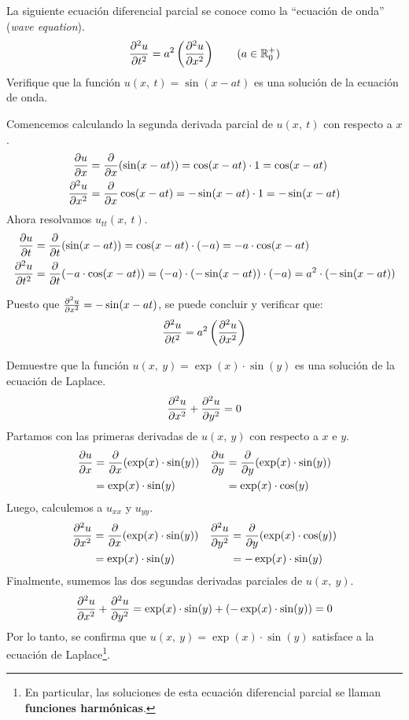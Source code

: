 \documentclass[12pt]{article}
\begin{document}
\ejemplo La siguiente ecuación diferencial parcial se conoce como la ``ecuación de onda'' (\textit{wave equation}).
\[
  \nderivpar[u]{2}{t} = a^{2} \left(\nderivpar[u]{2}{x}\right) \qquad (a \in \R_{0}^{+})
\]
Verifique que la función $u(x, \ t) = \sin(x - at)$ es una solución de la ecuación de onda.

\solucion Comencemos calculando la segunda derivada parcial de $u(x, \ t)$ con respecto a $x$.
\begin{align*}
      \derivpar[u]{x} &= \derivpar{x}(\sin(x - at)) = \cos(x - at) \cdot 1 = \cos(x - at) \\
  \nderivpar[u]{2}{x} &= \derivpar{x} \cos(x - at) = - \sin(x - at) \cdot 1 = -\sin(x - at)
\end{align*}
Ahora resolvamos $u_{tt}(x, \ t)$.
\begin{align*}
      \derivpar[u]{t} &= \derivpar{t}(\sin(x - at)) = \cos(x - at) \cdot (-a) = -a \cdot \cos(x - at) \\
  \nderivpar[u]{2}{t} &= \derivpar{t}(-a \cdot \cos(x - at)) = (-a) \cdot (-\sin(x - at)) \cdot (-a) = a^{2} \cdot (-\sin(x - at))
\end{align*}

Puesto que $\nderivpar[u]{2}{x} = -\sin(x - at)$, se puede concluir y verificar que:
\[
  \nderivpar[u]{2}{t} = a^{2} \left(\nderivpar[u]{2}{x}\right)
\]

\ejemplo Demuestre que la función $u(x, \ y) = \exp(x) \cdot \sin(y)$ es una solución de la ecuación de Laplace.
\[
  \nderivpar[u]{2}{x} + \nderivpar[u]{2}{y} = 0
\]
\solucion Partamos con las primeras derivadas de $u(x, \ y)$ con respecto a $x$ e $y$.
\begin{align*}
  \derivpar[u]{x} &= \derivpar{x} (\exp(x) \cdot \sin(y)) & \derivpar[u]{y} &= \derivpar{y}(\exp(x) \cdot \sin(y)) \\
                  &= \exp(x) \cdot \sin(y)                &                 &= \exp(x) \cdot \cos(y)
\end{align*}
Luego, calculemos a $u_{xx}$ y $u_{yy}$.
\begin{align*}
  \nderivpar[u]{2}{x} &= \derivpar{x} (\exp(x) \cdot \sin(y)) & \nderivpar[u]{2}{y} &= \derivpar{y} (\exp(x) \cdot \cos(y)) \\
                      &= \exp(x) \cdot \sin(y)                &                     &= - \exp(x) \cdot \sin(y)
\end{align*}
Finalmente, sumemos las dos segundas derivadas parciales de $u(x, \ y)$.
\[
  \nderivpar[u]{2}{x} + \nderivpar[u]{2}{y} = \exp(x) \cdot \sin(y) + (-\exp(x) \cdot \sin(y)) = 0
\]
Por lo tanto, se confirma que $u(x, \ y) = \exp(x) \cdot \sin(y)$ satisface a la ecuación de Laplace\footnote{En particular, las soluciones de esta ecuación diferencial parcial se llaman \textbf{funciones harmónicas}.}.
\end{document}
